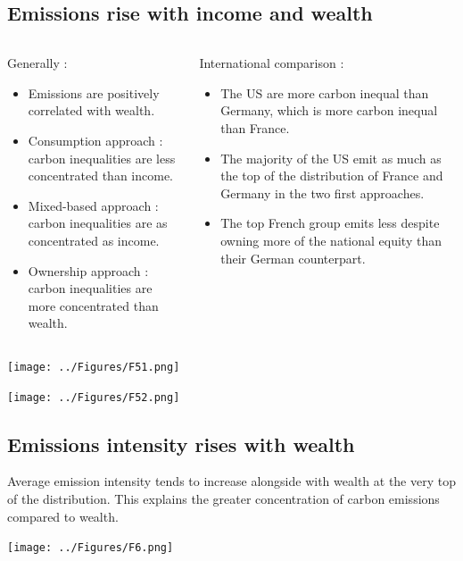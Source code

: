 \documentclass[10pt]{beamer}
\newcommand\ReduceFont{\fontsize{10}{7.2}\selectfont}
\begin{document}
\subsection{Emissions rise with income and wealth}
\begin{frame}{\subsecname}
    \begin{columns}
        \begin{column}{0.5\textwidth}
            Generally :
            \begin{itemize}
                \item Emissions are positively correlated with wealth.
                \item Consumption approach : carbon inequalities are less concentrated than income.
                \item Mixed-based approach : carbon inequalities are as concentrated as income.
                \item Ownership approach : carbon inequalities are more concentrated than wealth.
            \end{itemize}
        \end{column}
        \begin{column}{0.5\textwidth}
            \ReduceFont
            International comparison :
            \begin{itemize}
                \item The US are more carbon inequal than Germany, which is more carbon inequal than France.
                \item The majority of the US emit as much as the top of the distribution of France and Germany in the two first approaches.
                \item The top French group emits less despite owning more of the national equity than their German counterpart.
            \end{itemize}
        \end{column}
    \end{columns}
\end{frame}

\begin{frame}{\subsecname}
    \texttt{[image: ../Figures/F51.png]}
\end{frame}

\begin{frame}{\subsecname}
    \texttt{[image: ../Figures/F52.png]}
\end{frame}

\subsection{Emissions intensity rises with wealth}
\begin{frame}{\subsecname}
    Average emission intensity tends to increase alongside with wealth at the very top of the distribution.
    This explains the greater concentration of carbon emissions compared to wealth.
    \begin{center}
        \texttt{[image: ../Figures/F6.png]}
    \end{center}
\end{frame}
\end{document}
